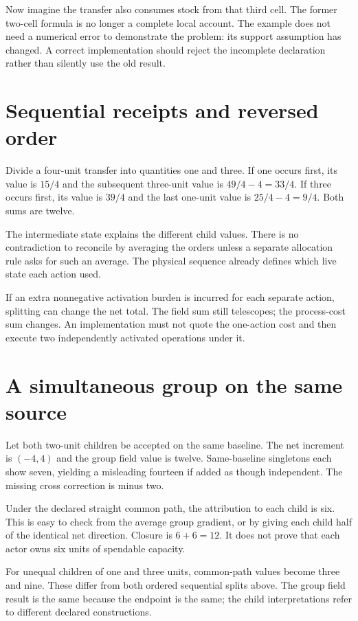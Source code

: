 Now imagine the transfer also consumes stock from that third cell. The
former two-cell formula is no longer a complete local account. The example
does not need a numerical error to demonstrate the problem: its support
assumption has changed. A correct implementation should reject the incomplete
declaration rather than silently use the old result.

\section{Sequential receipts and reversed order}
Divide a four-unit transfer into quantities one and three. If one occurs
first, its value is $15/4$ and the subsequent three-unit value is
$49/4-4=33/4$. If three occurs first, its value is $39/4$ and the last
one-unit value is $25/4-4=9/4$. Both sums are twelve.

The intermediate state explains the different child values. There is no
contradiction to reconcile by averaging the orders unless a separate
allocation rule asks for such an average. The physical sequence already
defines which live state each action used.

If an extra nonnegative activation burden is incurred for each separate
action, splitting can change the net total. The field sum still telescopes;
the process-cost sum changes. An implementation must not quote the one-action
cost and then execute two independently activated operations under it.

\section{A simultaneous group on the same source}
Let both two-unit children be accepted on the same baseline. The net
increment is $(-4,4)$ and the group field value is twelve. Same-baseline
singletons each show seven, yielding a misleading fourteen if added as
though independent. The missing cross correction is minus two.

Under the declared straight common path, the attribution to each child is
six. This is easy to check from the average group gradient, or by giving
each child half of the identical net direction. Closure is $6+6=12$.
It does not prove that each actor owns six units of spendable capacity.

For unequal children of one and three units, common-path values become
three and nine. These differ from both ordered sequential splits above.
The group field result is the same because the endpoint is the same;
the child interpretations refer to different declared constructions.

